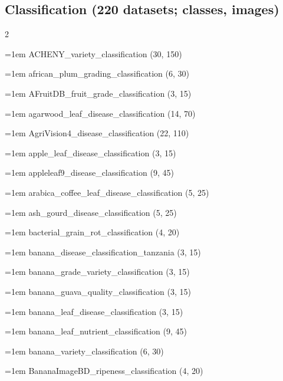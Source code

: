 \subsection*{Classification (220 datasets; classes, images)}
\begin{multicols}{2}\raggedright
\hangindent=1em ACHENY\_\allowbreak{}variety\_\allowbreak{}classification (30, 150)\par
\hangindent=1em african\_\allowbreak{}plum\_\allowbreak{}grading\_\allowbreak{}classification (6, 30)\par
\hangindent=1em AFruitDB\_\allowbreak{}fruit\_\allowbreak{}grade\_\allowbreak{}classification (3, 15)\par
\hangindent=1em agarwood\_\allowbreak{}leaf\_\allowbreak{}disease\_\allowbreak{}classification (14, 70)\par
\hangindent=1em AgriVision4\_\allowbreak{}disease\_\allowbreak{}classification (22, 110)\par
\hangindent=1em apple\_\allowbreak{}leaf\_\allowbreak{}disease\_\allowbreak{}classification (3, 15)\par
\hangindent=1em appleleaf9\_\allowbreak{}disease\_\allowbreak{}classification (9, 45)\par
\hangindent=1em arabica\_\allowbreak{}coffee\_\allowbreak{}leaf\_\allowbreak{}disease\_\allowbreak{}classification (5, 25)\par
\hangindent=1em ash\_\allowbreak{}gourd\_\allowbreak{}disease\_\allowbreak{}classification (5, 25)\par
\hangindent=1em bacterial\_\allowbreak{}grain\_\allowbreak{}rot\_\allowbreak{}classification (4, 20)\par
\hangindent=1em banana\_\allowbreak{}disease\_\allowbreak{}classification\_\allowbreak{}tanzania (3, 15)\par
\hangindent=1em banana\_\allowbreak{}grade\_\allowbreak{}variety\_\allowbreak{}classification (3, 15)\par
\hangindent=1em banana\_\allowbreak{}guava\_\allowbreak{}quality\_\allowbreak{}classification (3, 15)\par
\hangindent=1em banana\_\allowbreak{}leaf\_\allowbreak{}disease\_\allowbreak{}classification (3, 15)\par
\hangindent=1em banana\_\allowbreak{}leaf\_\allowbreak{}nutrient\_\allowbreak{}classification (9, 45)\par
\hangindent=1em banana\_\allowbreak{}variety\_\allowbreak{}classification (6, 30)\par
\hangindent=1em BananaImageBD\_\allowbreak{}ripeness\_\allowbreak{}classification (4, 20)\par

\end{multicols}

